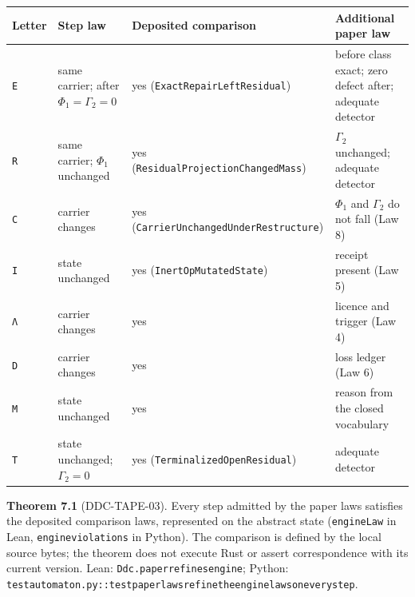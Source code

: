 \documentclass[
  11pt,
]{article}
\renewcommand{\_}{\ddcunderscore\allowbreak}
\begin{document}
\begin{longtable}[]{@{}
  >{\raggedright\arraybackslash}p{}
  >{\raggedright\arraybackslash}p{}
  >{\raggedright\arraybackslash}p{}
  >{\raggedright\arraybackslash}p{}@{}}
\toprule\noalign{}
\begin{minipage}[b]{\linewidth}\raggedright
Letter
\end{minipage} & \begin{minipage}[b]{\linewidth}\raggedright
Step law
\end{minipage} & \begin{minipage}[b]{\linewidth}\raggedright
Deposited comparison
\end{minipage} & \begin{minipage}[b]{\linewidth}\raggedright
Additional paper law
\end{minipage} \\
\midrule\noalign{}
\endhead
\bottomrule\noalign{}
\endlastfoot
\texttt{E} & same carrier; after \(\Phi_1 = \Gamma_2 = 0\) & yes
(\texttt{Exact\allowbreak Repair\allowbreak Left\allowbreak Residual}) & before class exact; zero defect
after; adequate detector \\
\texttt{R} & same carrier; \(\Phi_1\) unchanged & yes
(\texttt{Residual\allowbreak Projection\allowbreak Changed\allowbreak Mass}) & \(\Gamma_2\) unchanged;
adequate detector \\
\texttt{C} & carrier changes & yes
(\texttt{Carrier\allowbreak Unchanged\allowbreak Under\allowbreak Restructure}) & \(\Phi_1\) and
\(\Gamma_2\) do not fall (Law 8) \\
\texttt{I} & state unchanged & yes (\texttt{Inert\allowbreak Op\allowbreak Mutated\allowbreak State}) &
receipt present (Law 5) \\
\texttt{Λ} & carrier changes & yes & licence and trigger (Law 4) \\
\texttt{D} & carrier changes & yes & loss ledger (Law 6) \\
\texttt{M} & state unchanged & yes & reason from the closed
vocabulary \\
\texttt{T} & state unchanged; \(\Gamma_2 = 0\) & yes
(\texttt{Terminalized\allowbreak Open\allowbreak Residual}) & adequate detector \\
\end{longtable}

\textbf{Theorem 7.1} (DDC-TAPE-03). Every step admitted by the paper
laws satisfies the deposited comparison laws, represented on the
abstract state (\texttt{engine\allowbreak Law} in Lean, \texttt{engine\_violations}
in Python). The comparison is defined by the local source bytes; the
theorem does not execute Rust or assert correspondence with its current
version. Lean: \texttt{Ddc.\allowbreak paper\_refines\_engine}; Python:
\texttt{test\_automaton.\allowbreak py::test\_paper\_laws\_refine\_the\_engine\_laws\_on\_every\_step}.
\end{document}

